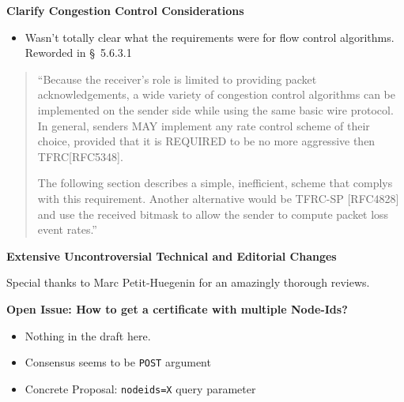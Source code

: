 \documentclass[helvetica]{seminar}
\newcommand{\heading}[1]{%
  \begin{center} 
    \large\bf 
    #1 
  \end{center} 
  \vspace{.4 in}}
\begin{document}
\begin{slide}
\heading{Clarify Congestion Control Considerations}

\begin{itemize}
\item Wasn't totally clear what the requirements were for flow control algorithms.
Reworded in \S\ 5.6.3.1
\end{itemize}

\small{
\begin{quote}
   ``Because the receiver's role is limited to providing packet
   acknowledgements, a wide variety of congestion control algorithms can
   be implemented on the sender side while using the same basic wire
   protocol.  In general, senders MAY implement any rate control scheme
   of their choice, provided that it is REQUIRED to be no more
   aggressive then TFRC[RFC5348].

   The following section describes a simple, inefficient, scheme that
   complys with this requirement.  Another alternative would be TFRC-SP
   [RFC4828] and use the received bitmask to allow the sender to compute
   packet loss event rates.''
\end{quote}
}

\end{slide}

\begin{slide}
\heading{Extensive Uncontroversial Technical and Editorial Changes}

Special thanks to Marc Petit-Huegenin for an amazingly thorough reviews.
\end{slide}


\begin{slide}
\heading{Open Issue: How to get a certificate with multiple Node-Ids?}

\begin{itemize}
\item Nothing in the draft here.
\item Consensus seems to be \verb^POST^ argument
\item Concrete Proposal: \verb^nodeids=X^ query parameter
\end{itemize}

\end{slide}
\end{document}

